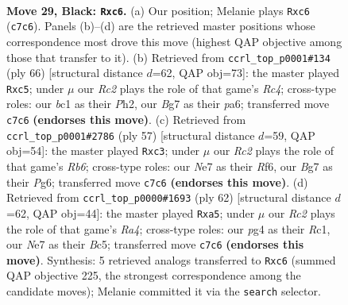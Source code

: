 \documentclass[11pt]{article}
\begin{document}
\clearpage

\begin{figure}[p]\centering
\begin{subfigure}{0.46\textwidth}\centering
\resizebox{\linewidth}{!}{%
\newchessgame
\chessboard[
  setfen={r5k1/p1r1n1bp/PpP2p2/7R/4pPP1/8/4B3/R1B1K3 b Q - 2 29},
  showmover=false,
  pgfstyle=straightmove, color=movearrow, markmove={c7-c6}
]}
\caption{}
\end{subfigure}\hfill
\begin{subfigure}{0.46\textwidth}\centering
\resizebox{\linewidth}{!}{%
\newchessgame
\chessboard[
  setfen={2r3k1/1b3pp1/p3p2p/2p5/N1R1P3/3r4/1P3PPP/R5K1 w - - 0 34},
  showmover=false,
  pgfstyle=straightmove, color=movearrow, markmove={c4-c5}
]}
\caption{}
\end{subfigure}
\\[4pt]
\begin{subfigure}{0.46\textwidth}\centering
\resizebox{\linewidth}{!}{%
\newchessgame
\chessboard[
  setfen={7R/4pk1p/p1p2rp1/4R3/P7/brP1B3/4KPPP/8 b - - 4 29},
  showmover=false,
  pgfstyle=straightmove, color=movearrow, markmove={b3-c3}
]}
\caption{}
\end{subfigure}\hfill
\begin{subfigure}{0.46\textwidth}\centering
\resizebox{\linewidth}{!}{%
\newchessgame
\chessboard[
  setfen={2br4/2p2k2/5r1p/pPB1b1p1/R2pP3/3B1P2/6P1/2R3K1 w - - 6 32},
  showmover=false,
  pgfstyle=straightmove, color=movearrow, markmove={a4-a5}
]}
\caption{}
\end{subfigure}
\caption{\textbf{Move 29, Black: \texttt{Rxc6}.} (a) Our position; Melanie plays \texttt{Rxc6} (\texttt{c7c6}). Panels (b)--(d) are the retrieved master positions whose correspondence most drove this move (highest QAP objective among those that transfer to it). (b) Retrieved from \texttt{ccrl\_top\_p0001\#134} (ply 66) [structural distance $d$=62, QAP obj=73]: the master played \texttt{Rxc5}; under $\mu$ our \emph{Rc2} plays the role of that game's \emph{Rc4}; cross-type roles: our \emph{b}c1 as their \emph{P}h2, our \emph{B}g7 as their \emph{p}a6; transferred move \texttt{c7c6} \textbf{(endorses this move)}. (c) Retrieved from \texttt{ccrl\_top\_p0001\#2786} (ply 57) [structural distance $d$=59, QAP obj=54]: the master played \texttt{Rxc3}; under $\mu$ our \emph{Rc2} plays the role of that game's \emph{Rb6}; cross-type roles: our \emph{N}e7 as their \emph{R}f6, our \emph{B}g7 as their \emph{P}g6; transferred move \texttt{c7c6} \textbf{(endorses this move)}. (d) Retrieved from \texttt{ccrl\_top\_p0000\#1693} (ply 62) [structural distance $d$=62, QAP obj=44]: the master played \texttt{Rxa5}; under $\mu$ our \emph{Rc2} plays the role of that game's \emph{Ra4}; cross-type roles: our \emph{p}g4 as their \emph{R}c1, our \emph{N}e7 as their \emph{B}c5; transferred move \texttt{c7c6} \textbf{(endorses this move)}. Synthesis: 5 retrieved analogs transferred to \texttt{Rxc6} (summed QAP objective 225, the strongest correspondence among the candidate moves); Melanie committed it via the \texttt{search} selector.}
\label{fig:thought-m57}
\end{figure}
\end{document}
